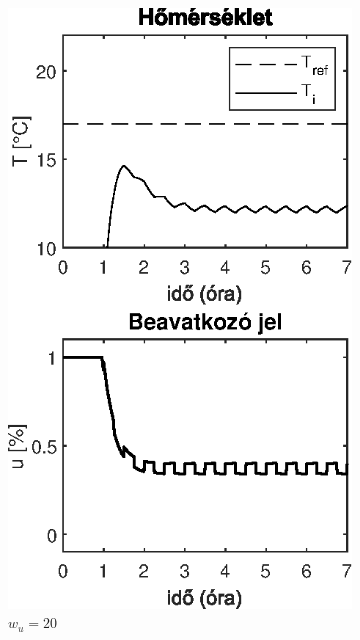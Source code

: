 \begin{figure}[H]
\begin{subfigure}[t]{0.32\textwidth}
	\centering
	\includegraphics[width=\textwidth]{figures/realsys/mpc-wu-20}
	\caption{$w_u=20$}
	\label{fig:mpc-wu-20}
\end{subfigure}
~
\begin{subfigure}[t]{0.32\textwidth}
	\centering

\end{subfigure}
\end{figure}
